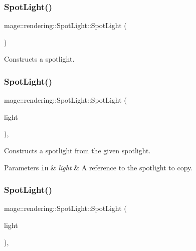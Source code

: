 \subsubsection{\texorpdfstring{Spot\+Light()}{SpotLight()}\hspace{0.1cm}{\footnotesize\ttfamily [1/3]}}
{\footnotesize\ttfamily mage\+::rendering\+::\+Spot\+Light\+::\+Spot\+Light (\begin{DoxyParamCaption}{ }\end{DoxyParamCaption})\hspace{0.3cm}{\ttfamily [noexcept]}}

Constructs a spotlight. \mbox{\label{classmage_1_1rendering_1_1_spot_light_a3e94a01b574efb8af5540e24d7af75c6}} 
\subsubsection{\texorpdfstring{Spot\+Light()}{SpotLight()}\hspace{0.1cm}{\footnotesize\ttfamily [2/3]}}
{\footnotesize\ttfamily mage\+::rendering\+::\+Spot\+Light\+::\+Spot\+Light (\begin{DoxyParamCaption}\item[{const \mbox{\hyperlink{classmage_1_1rendering_1_1_spot_light}{Spot\+Light}} \&}]{light }\end{DoxyParamCaption})\hspace{0.3cm}{\ttfamily [default]}, {\ttfamily [noexcept]}}

Constructs a spotlight from the given spotlight.


\begin{DoxyParams}[1]{Parameters}
\mbox{\tt in}  & {\em light} & A reference to the spotlight to copy. \\
\hline
\end{DoxyParams}
\mbox{\label{classmage_1_1rendering_1_1_spot_light_a3520d2b04ca636436211e8e4fd929b42}} 
\subsubsection{\texorpdfstring{Spot\+Light()}{SpotLight()}\hspace{0.1cm}{\footnotesize\ttfamily [3/3]}}
{\footnotesize\ttfamily mage\+::rendering\+::\+Spot\+Light\+::\+Spot\+Light (\begin{DoxyParamCaption}\item[{\mbox{\hyperlink{classmage_1_1rendering_1_1_spot_light}{Spot\+Light}} \&\&}]{light }\end{DoxyParamCaption})\hspace{0.3cm}{\ttfamily [default]}, {\ttfamily [noexcept]}}

